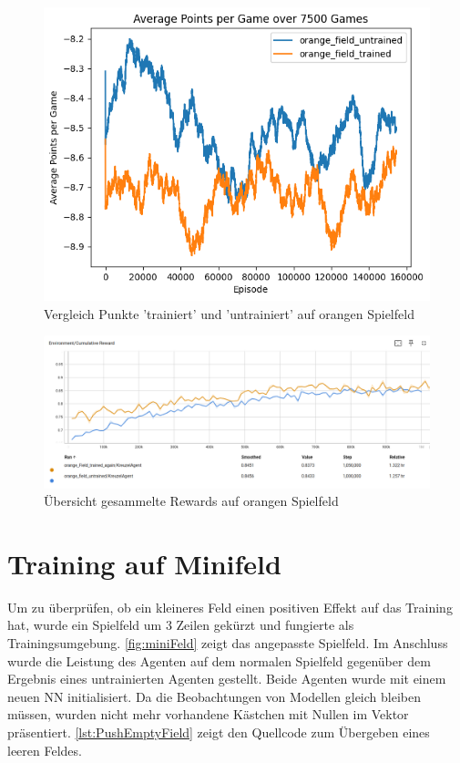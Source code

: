 \begin{figure}[!h]
    \centering
    \includegraphics[scale=0.6]{Bilder/points_orange_field.png}
    \caption{Vergleich Punkte 'trainiert' und 'untrainiert' auf orangen Spielfeld}
    \label{fig:orange_points}
\end{figure}
\begin{figure}[!h]
    \centering
    \includegraphics[scale=0.3]{Bilder/rewards_orange_field.png}
    \caption{Übersicht gesammelte Rewards auf orangen Spielfeld}
    \label{fig:orange_rewards}

\end{figure}

\newpage
\section{Training auf Minifeld}
Um zu überprüfen, ob ein kleineres Feld  einen positiven Effekt auf das Training hat, wurde ein Spielfeld um 3 Zeilen gekürzt und fungierte als Trainingsumgebung. \ref{fig:miniFeld} zeigt das angepasste Spielfeld. Im Anschluss wurde die Leistung des Agenten auf dem normalen Spielfeld gegenüber dem Ergebnis eines untrainierten Agenten gestellt.  Beide Agenten wurde mit einem neuen NN initialisiert.
Da die Beobachtungen von Modellen gleich bleiben müssen, wurden nicht mehr vorhandene Kästchen mit Nullen im Vektor präsentiert. \ref{lst:PushEmptyField} zeigt den Quellcode zum Übergeben eines leeren Feldes.

